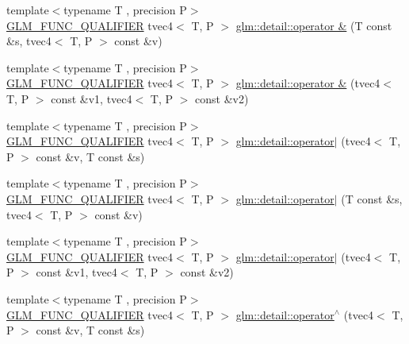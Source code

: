 \begin{DoxyCompactItemize}
\item 
{\footnotesize template$<$typename T , precision P$>$ }\\\hyperlink{setup_8hpp_a33fdea6f91c5f834105f7415e2a64407}{G\+L\+M\+\_\+\+F\+U\+N\+C\+\_\+\+Q\+U\+A\+L\+I\+F\+I\+ER} tvec4$<$ T, P $>$ \hyperlink{namespaceglm_1_1detail_ad72059ea14e7aa85ce8e643982fa4458}{glm\+::detail\+::operator \&} (T const \&s, tvec4$<$ T, P $>$ const \&v)
\item 
{\footnotesize template$<$typename T , precision P$>$ }\\\hyperlink{setup_8hpp_a33fdea6f91c5f834105f7415e2a64407}{G\+L\+M\+\_\+\+F\+U\+N\+C\+\_\+\+Q\+U\+A\+L\+I\+F\+I\+ER} tvec4$<$ T, P $>$ \hyperlink{namespaceglm_1_1detail_a66c7e3cf71dee53ef08db2852a210239}{glm\+::detail\+::operator \&} (tvec4$<$ T, P $>$ const \&v1, tvec4$<$ T, P $>$ const \&v2)
\item 
{\footnotesize template$<$typename T , precision P$>$ }\\\hyperlink{setup_8hpp_a33fdea6f91c5f834105f7415e2a64407}{G\+L\+M\+\_\+\+F\+U\+N\+C\+\_\+\+Q\+U\+A\+L\+I\+F\+I\+ER} tvec4$<$ T, P $>$ \hyperlink{namespaceglm_1_1detail_a81f810a71c238bdbff2dbef2ae6c2704}{glm\+::detail\+::operator$\vert$} (tvec4$<$ T, P $>$ const \&v, T const \&s)
\item 
{\footnotesize template$<$typename T , precision P$>$ }\\\hyperlink{setup_8hpp_a33fdea6f91c5f834105f7415e2a64407}{G\+L\+M\+\_\+\+F\+U\+N\+C\+\_\+\+Q\+U\+A\+L\+I\+F\+I\+ER} tvec4$<$ T, P $>$ \hyperlink{namespaceglm_1_1detail_a0587c2a8bd25e48fca710a38640f3ab2}{glm\+::detail\+::operator$\vert$} (T const \&s, tvec4$<$ T, P $>$ const \&v)
\item 
{\footnotesize template$<$typename T , precision P$>$ }\\\hyperlink{setup_8hpp_a33fdea6f91c5f834105f7415e2a64407}{G\+L\+M\+\_\+\+F\+U\+N\+C\+\_\+\+Q\+U\+A\+L\+I\+F\+I\+ER} tvec4$<$ T, P $>$ \hyperlink{namespaceglm_1_1detail_a7e161c867643b93eee6b037e826d8317}{glm\+::detail\+::operator$\vert$} (tvec4$<$ T, P $>$ const \&v1, tvec4$<$ T, P $>$ const \&v2)
\item 
{\footnotesize template$<$typename T , precision P$>$ }\\\hyperlink{setup_8hpp_a33fdea6f91c5f834105f7415e2a64407}{G\+L\+M\+\_\+\+F\+U\+N\+C\+\_\+\+Q\+U\+A\+L\+I\+F\+I\+ER} tvec4$<$ T, P $>$ \hyperlink{namespaceglm_1_1detail_af1856824f16f11f0df65b157d1a633e1}{glm\+::detail\+::operator$^\wedge$} (tvec4$<$ T, P $>$ const \&v, T const \&s)
\item 

\end{DoxyCompactItemize}
